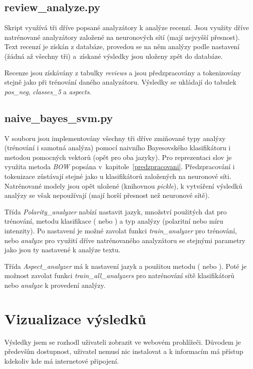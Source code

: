 \subsection{review\_analyze.py}
Skript využívá tři dříve popsané analyzátory k analýze recenzí. Jsou využity dříve natrénované analyzátory založené na neuronových sítí (mají nejvyšší přesnost). Text recenzí je získán z databáze, provedou se na něm analýzy podle nastavení (žádná až všechny tři) a~získané výsledky jsou uloženy zpět do databáze.

Recenze jsou získávány z tabulky \emph{reviews} a jsou předzpracovány a tokenizovány stejně jako při trénování daného analyzátoru. Výsledky se ukládají do tabulek \emph{pos\_neg}, \emph{classes\_5} a \emph{aspects}.

\subsection{naive\_bayes\_svm.py}
V souboru jsou implementovány všechny tři dříve zmiňované typy analýzy (trénování i samotná analýza) pomocí naivního Bayesovského klasifikátoru i metodou pomocných vektorů (opět pro oba jazyky). Pro reprezentaci slov je využita metoda \emph{BOW} popsána v~kapitole~\ref{predzpracovani}. Předzpracování i tokenizace zůstávají stejné jako u klasifikátorů založených na neuronové síti. Natrénované modely jsou opět uložené (knihovnou \emph{pickle}), k vytváření výsledků analýzy se však nepoužívají (mají horší přesnost než neuronové sítě).

Třída \emph{Polarity\_analyzer} nabízí nastavit jazyk, množství použitých dat pro trénování, metodu klasifikace ( nebo ) a typ analýzy (polaritní nebo míru intenzity). Po nastavení je možné  zavolat funkci \emph{train\_analyzer} pro trénování, nebo \emph{analyze} pro využití dříve natrénovaného analyzátoru se stejnými parametry jako jsou ty nastavené k analýze textu.

Třída \emph{Aspect\_analyzer} má k nastavení jazyk a použitou metodu ( nebo ). Poté je možnost zavolat funkci \emph{train\_all\_analyzers} pro natrénování sítě klasifikátorů nebo \emph{analyze} k provedení analýzy.



\section{Vizualizace výsledků}

Výsledky jsem se rozhodl uživateli zobrazit ve webovém prohlížeči. Důvodem je především dostupnost, uživatel nemusí nic instalovat a k informacím má přístup kdekoliv kde má internetové připojení. 

